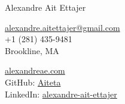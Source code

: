 \documentclass[11pt]{article}
\begin{document}
\begin{flushleft}
    {\huge Alexandre Ait Ettajer} \\
\end{flushleft}
\begin{multicols}{2}
    \raggedright
    \href{mailto:alexandre.aitettajer@gmail.com}{alexandre.aitettajer@gmail.com} \\
    +1 (281) 435-9481 \\
    Brookline, MA \\
    
    \columnbreak
    
    \raggedleft
    \href{https://www.alexandreae.com}{alexandreae.com} \\
    GitHub: \href{https://github.com/aiteta}{Aiteta} \\
    LinkedIn: \href{https://www.linkedin.com/in/alexandre-ait-ettajer-65740b170/}{alexandre-ait-ettajer}
\end{multicols}
\end{document}
